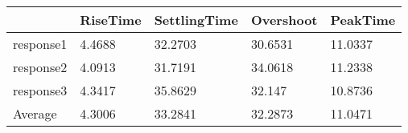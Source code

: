 \begin{tabular}{lllll}
  & RiseTime & SettlingTime & Overshoot & PeakTime \\ 
\hline 
response1 & 4.4688 & 32.2703 & 30.6531 & 11.0337 \\ 
response2 & 4.0913 & 31.7191 & 34.0618 & 11.2338 \\ 
response3 & 4.3417 & 35.8629 & 32.147 & 10.8736 \\ 
Average & 4.3006 & 33.2841 & 32.2873 & 11.0471 \\ 
\hline 
\end{tabular}